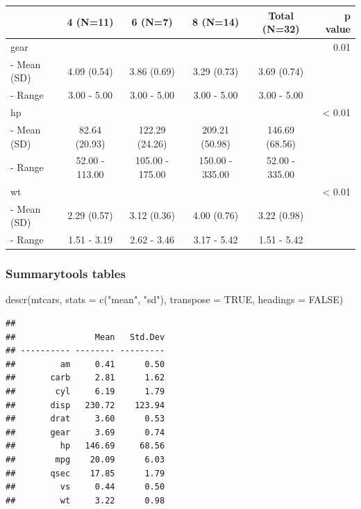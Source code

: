 \documentclass[
]{article}
\newenvironment{Shaded}{\begin{snugshade}}{\end{snugshade}}
\newcommand{\AttributeTok}[1]{\textcolor[rgb]{0.77,0.63,0.00}{#1}}
\newcommand{\ConstantTok}[1]{\textcolor[rgb]{0.00,0.00,0.00}{#1}}
\newcommand{\FunctionTok}[1]{\textcolor[rgb]{0.00,0.00,0.00}{#1}}
\newcommand{\NormalTok}[1]{#1}
\newcommand{\StringTok}[1]{\textcolor[rgb]{0.31,0.60,0.02}{#1}}
\begin{document}
\begin{longtable}[]{@{}lccccr@{}}
\toprule
& 4 (N=11) & 6 (N=7) & 8 (N=14) & Total (N=32) & p value \\
\midrule
\endhead
gear & & & & & 0.01 \\
- Mean (SD) & 4.09 (0.54) & 3.86 (0.69) & 3.29 (0.73) & 3.69 (0.74) & \\
- Range & 3.00 - 5.00 & 3.00 - 5.00 & 3.00 - 5.00 & 3.00 - 5.00 & \\
hp & & & & & \textless{} 0.01 \\
- Mean (SD) & 82.64 (20.93) & 122.29 (24.26) & 209.21 (50.98) & 146.69 (68.56) & \\
- Range & 52.00 - 113.00 & 105.00 - 175.00 & 150.00 - 335.00 & 52.00 - 335.00 & \\
wt & & & & & \textless{} 0.01 \\
- Mean (SD) & 2.29 (0.57) & 3.12 (0.36) & 4.00 (0.76) & 3.22 (0.98) & \\
- Range & 1.51 - 3.19 & 2.62 - 3.46 & 3.17 - 5.42 & 1.51 - 5.42 & \\
\bottomrule
\end{longtable}

\hypertarget{summarytools-tables}{%
\subsubsection{Summarytools tables}\label{summarytools-tables}}

\begin{Shaded}
\begin{Highlighting}[]
\FunctionTok{descr}\NormalTok{(mtcars, }\AttributeTok{stats =} \FunctionTok{c}\NormalTok{(}\StringTok{"mean"}\NormalTok{, }\StringTok{"sd"}\NormalTok{), }\AttributeTok{transpose =} \ConstantTok{TRUE}\NormalTok{, }\AttributeTok{headings =} \ConstantTok{FALSE}\NormalTok{)}
\end{Highlighting}
\end{Shaded}

\begin{verbatim}
## 
##                Mean   Std.Dev
## ---------- -------- ---------
##         am     0.41      0.50
##       carb     2.81      1.62
##        cyl     6.19      1.79
##       disp   230.72    123.94
##       drat     3.60      0.53
##       gear     3.69      0.74
##         hp   146.69     68.56
##        mpg    20.09      6.03
##       qsec    17.85      1.79
##         vs     0.44      0.50
##         wt     3.22      0.98
\end{verbatim}
\end{document}

